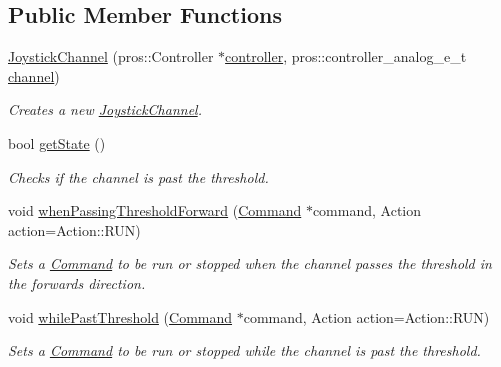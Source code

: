\subsection*{Public Member Functions}
\begin{DoxyCompactItemize}
\item 
\mbox{\hyperlink{classlib_iterative_robot_1_1_joystick_channel_a75bf0fa44f1d1b06c263b42140d31bbe}{Joystick\+Channel}} (pros\+::\+Controller $\ast$\mbox{\hyperlink{classlib_iterative_robot_1_1_joystick_channel_a78323bb91c0512d9c9c7b914fc710f65}{controller}}, pros\+::controller\+\_\+analog\+\_\+e\+\_\+t \mbox{\hyperlink{classlib_iterative_robot_1_1_joystick_channel_a2985ecdc2e4e6cd768b379abe7726aef}{channel}})
\begin{DoxyCompactList}\small\item\em Creates a new \mbox{\hyperlink{classlib_iterative_robot_1_1_joystick_channel}{Joystick\+Channel}}. \end{DoxyCompactList}\item 
bool \mbox{\hyperlink{classlib_iterative_robot_1_1_joystick_channel_a2f7c748f53c30fbbde34c14aa494343e}{get\+State}} ()
\begin{DoxyCompactList}\small\item\em Checks if the channel is past the threshold. \end{DoxyCompactList}\item 
void \mbox{\hyperlink{classlib_iterative_robot_1_1_joystick_channel_abd2ccc1b4789ef1896f8b49192ef2ecd}{when\+Passing\+Threshold\+Forward}} (\mbox{\hyperlink{classlib_iterative_robot_1_1_command}{Command}} $\ast$command, Action action=Action\+::\+R\+UN)
\begin{DoxyCompactList}\small\item\em Sets a \mbox{\hyperlink{classlib_iterative_robot_1_1_command}{Command}} to be run or stopped when the channel passes the threshold in the forwards direction. \end{DoxyCompactList}\item 
void \mbox{\hyperlink{classlib_iterative_robot_1_1_joystick_channel_a7a37bb64fd71d3b2cb774c38a83d8977}{while\+Past\+Threshold}} (\mbox{\hyperlink{classlib_iterative_robot_1_1_command}{Command}} $\ast$command, Action action=Action\+::\+R\+UN)
\begin{DoxyCompactList}\small\item\em Sets a \mbox{\hyperlink{classlib_iterative_robot_1_1_command}{Command}} to be run or stopped while the channel is past the threshold. \end{DoxyCompactList}\item 

\end{DoxyCompactItemize}
